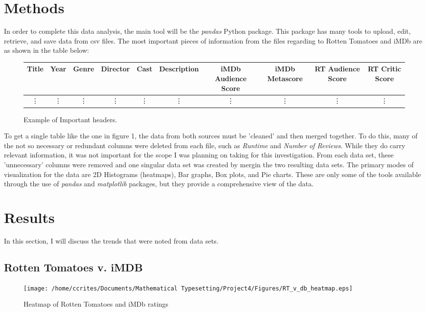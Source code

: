 \documentclass[10pt]{article}
\begin{document}
\section*{Methods}\label{Sec_Methods}
In order to complete this data analysis, the main tool will be the \textit{pandas} Python package. This package has many tools to upload, edit, retrieve, and save data from csv files. The most important pieces of information from the files regarding to Rotten Tomatoes and iMDb are as shown in the table below:
\begin{figure}[h]
\begin{tabular}{|c|c|c|c|c|c|c|c|c|c|}
	\hline 
	\tiny{Title} & \tiny{Year} & \tiny{Genre} & \tiny{Director} & \tiny{Cast} & \tiny{Description} & \tiny{iMDb Audience Score} & \tiny{iMDb Metascore} & \tiny{RT Audience Score} & \tiny{RT Critic Score} \\
	\hline
	\vdots & \vdots & \vdots & \vdots & \vdots & \vdots & \vdots & \vdots & \vdots & \vdots \\
\end{tabular}
	\caption{\label{fig1}  Example of Important headers.}
\end{figure}
\par To get a single table like the one in figure 1, the data from both sources must be 'cleaned' and then merged together. To do this, many of the not so necessary or redundant columns were deleted from each file, such as \textit{Runtime} and \textit{Number of Reviews}. While they do carry relevant information, it was not important for the scope I was planning on taking for this investigation. From each data set, these 'unnecessary' columns were removed and one singular data set was created by mergin the two resulting data sets. The primary modes of visualization for the data are 2D Histograms (heatmaps), Bar graphs, Box plots, and Pie charts. These are only some of the tools available through the use of \textit{pandas} and \textit{matplotlib} packages, but they provide a comprehensive view of the data. 

\section*{Results}\label{Sec_Results}
\par In this section, I will discuss the trends that were noted from data sets.

\subsection*{Rotten Tomatoes v. iMDB}
\begin{wrapfigure}{l}{0.5\linewidth}
	\texttt{[image: /home/ccrites/Documents/Mathematical Typesetting/Project4/Figures/RT\_v\_db\_heatmap.eps]}
	\caption{\label{fig2} Heatmap of Rotten Tomatoes and iMDb ratings}
\end{wrapfigure}
\end{document}
